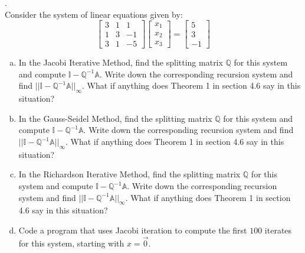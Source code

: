 \documentclass[12 pt]{article}
\begin{document}
    . \\
    Consider the system of linear equations given by:
    $$
    \begin{bmatrix} 3 & 1 & 1 \\ 1 & 3 & -1 \\ 3 & 1 & -5 \end{bmatrix}
\begin{bmatrix} x_1 \\ x_2 \\ x_3 \end{bmatrix}
=
\begin{bmatrix} 5 \\ 3 \\ -1 \end{bmatrix}
$$
\begin{enumerate}[a)]
  \item In the Jacobi Iterative Method, find the splitting matrix $\mathbb{Q}$ for this system and compute
  $\mathbb{I} - \mathbb{Q}^{-1} \mathbb{A}$. Write down the corresponding recursion system and
  find $|| \mathbb{I}-\mathbb{Q}^{-1}\mathbb{A}||_{\infty}$. What if anything does Theorem 1 in section 4.6 say in this situation?
  
  \noindent
  \item In the Gauss-Seidel Method, find the splitting matrix $\mathbb{Q}$ for this system and compute
  $\mathbb{I} - \mathbb{Q}^{-1} \mathbb{A}$. Write down the corresponding recursion system and
  find $|| \mathbb{I}-\mathbb{Q}^{-1}\mathbb{A}||_{\infty}$. What if anything does Theorem 1 in section 4.6 say in this situation?
  
  \noindent
  \item In the Richardson Iterative Method, find the splitting matrix $\mathbb{Q}$ for this system and compute
  $\mathbb{I} - \mathbb{Q}^{-1} \mathbb{A}$. Write down the corresponding recursion system and
  find $|| \mathbb{I}-\mathbb{Q}^{-1}\mathbb{A}||_{\infty}$. What if anything does Theorem 1 in section 4.6 say in this situation?
  \item
  Code a program that uses Jacobi iteration to compute the first $100$ iterates for this system, starting with $x = \vec{0}$.
  \end{enumerate}
  
\end{document}
